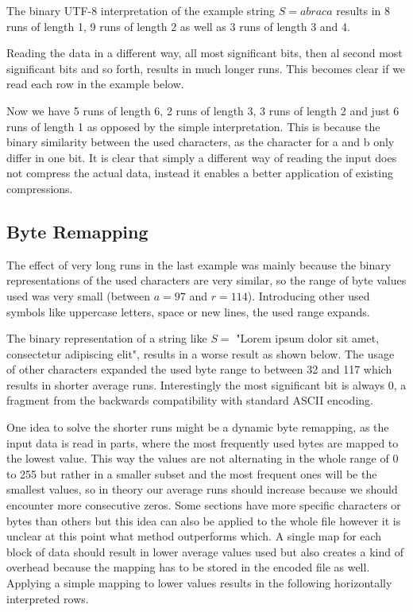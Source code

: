 \par{
The binary UTF-8 interpretation of the example string $S = abraca$ results in 8 runs of length 1, 9 runs of length 2 as well as 3 runs of length 3 and 4.  
\scalardump\dataA

Reading the data in a different way, all most significant bits, then al second most significant bits and so forth, results in much longer runs. This becomes clear if we read each row in the example below. 
\arraydump\dataA

Now we have 5 runs of length 6, 2 runs of length 3, 3 runs of length 2 and just 6 runs of length 1 as opposed by the simple interpretation. This is because the binary similarity between the used characters, as the character for a and b only differ in one bit. It is clear that simply a different way of reading the input does not compress the actual data, instead it enables a better application of existing compressions. 
}

\subsection{Byte Remapping}
\label{ch:Analysis:sec:Improvements by Preprocessing:subSec:byteRemapping}
\par{
The effect of very long runs in the last example was mainly because the binary representations of the used characters are very similar, so the range of byte values used was very small (between $a = 97$ and $r = 114$). Introducing other used symbols like uppercase letters, space or new lines, the used range expands.
}

\par{
The binary representation of a string like $S =$ "Lorem ipsum dolor sit amet, consectetur adipiscing elit", results in a worse result as shown below. 
The usage of other characters expanded the used byte range to between 32 and 117 which results in shorter average runs. Interestingly the most significant bit is always 0, a fragment from the backwards compatibility with standard ASCII encoding.

\arraydump\dataB
}

\par{
One idea to solve the shorter runs might be a dynamic byte remapping, as the input data is read in parts, where the most frequently used bytes are mapped to the lowest value. This way the values are not alternating in the whole range of 0 to 255 but rather in a smaller subset and the most frequent ones will be the smallest values, so in theory our average runs should increase because we should encounter more consecutive zeros. Some sections have more specific characters or bytes than others but this idea can also be applied to the whole file however it is unclear at this point what method outperforms which. A single map for each block of data should result in lower average values used but also creates a kind of overhead because the mapping has to be stored in the encoded file as well. Applying a simple mapping to lower values results in the following horizontally interpreted rows.
}

